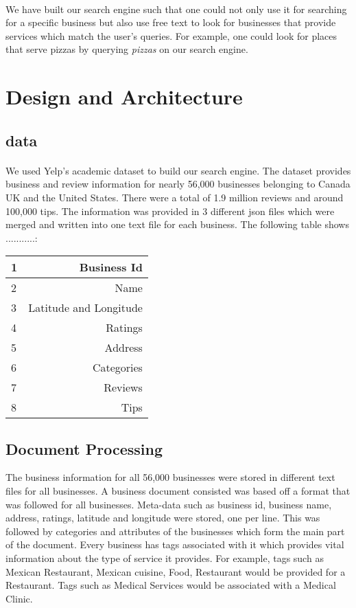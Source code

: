 \documentclass{article} %
\begin{document}
\paragraph{}We have built our search engine such that one could not only use it for searching for a specific business but also use free text to look for businesses that provide services which match the user's queries. For example, one could look for places that serve pizzas by querying \textit{pizzas} on our search engine. 
\section{Design and Architecture}
\subsection{data}
\paragraph{}We used Yelp's academic dataset to build our search engine. The dataset provides business and review information for nearly 56,000 businesses belonging to Canada UK and the United States. There were a total of 1.9 million reviews and around 100,000 tips. The information was provided in 3 different json files which were merged and written into one text file for each business. The following table shows ...........:
\begin{center}
    \begin{tabular}{| l | r |}
    \hline
    1 & Business Id \\ \hline
    2 & Name  \\  \hline
    3 & Latitude and Longitude \\ \hline 
	4 & Ratings \\ \hline    
    5 & Address \\ \hline
    6 & Categories \\ \hline
    7 & Reviews \\ \hline
    8 & Tips \\ \hline
\end{tabular}
\end{center}
 
\subsection{Document Processing}
The business information for all 56,000 businesses were stored in different text files for all businesses. A business document consisted was based off a format that was followed for all businesses. Meta-data such as business id, business name, address, ratings, latitude and longitude were stored, one per line. This was followed by categories and attributes of the businesses which form the main part of the document.
Every business has tags associated with it which provides vital information about the type of service it provides. For example, tags such as Mexican Restaurant, Mexican cuisine, Food, Restaurant would be provided for a Restaurant. Tags such as Medical Services would be associated with a Medical Clinic.
\end{document}
